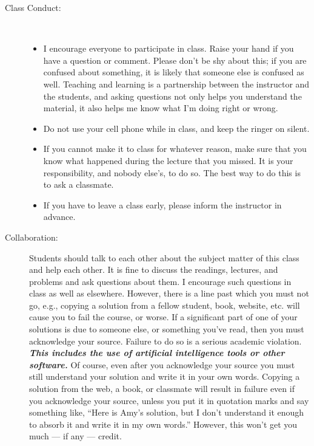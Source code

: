 \documentclass [letterpaper,11pt]{article}
\begin{document}
\begin{description}
\item[Class Conduct:] \
   \begin{itemize}\setlength{\itemsep}{0em}\setlength{\parskip}{0pt}
   	\item I encourage everyone to participate in class. Raise your hand if you have a question or
comment. Please don't be shy about this; if you are confused about something, it is likely
that someone else is confused as well. Teaching and learning is a partnership between
the instructor and the students, and asking questions not only helps you understand the
material, it also helps me know what I'm doing right or wrong.
	\item Do not use your cell phone while in class, and keep the ringer on silent.
	
	\item  If you cannot make it to class for whatever reason, make sure that you know what
happened during the lecture that you missed. It is your responsibility, and nobody
else's, to do so. The best way to do this is to ask a classmate. 
	\item If you have to leave a class early, please inform the instructor in advance. 	     
     \end{itemize}


\item[Collaboration:]
Students should talk to each other about the subject matter of this class and help each other.  It is fine to discuss the readings, lectures, and problems and ask questions about them. I encourage such questions in class as well as elsewhere. However, there is a line past which you must not go, e.g., copying a solution from a fellow student, book, website, etc. will cause you to fail the course, or worse. If a significant part of one of your solutions is due to someone else, or something you've read, then you must acknowledge your source. Failure to do so is a serious academic violation.  \emph{\textbf{ This includes the use of artificial
intelligence tools or other software.}} Of course, even after you acknowledge your source you must still understand your solution and write it in your own words. Copying a solution from the web, a book, or classmate will result in failure even if you acknowledge your source, unless you put it in quotation marks and say something like, ``Here is Amy's solution, but I don't understand it enough to absorb it and write it in my own words.'' However, this won't get you much --- if any --- credit. 


\end{description}
\end{document}
